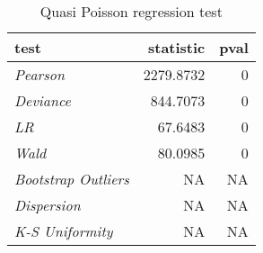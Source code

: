 \begin{table}[H]

\caption{\label{tab:quasipoisson_reg_tests}Quasi Poisson regression test}
\centering
\begin{tabular}[t]{>{}l|r|r}
\hline
test & statistic & pval\\
\hline
\hline
\em{Pearson} & 2279.8732 & 0\\
\hline
\em{Deviance} & 844.7073 & 0\\
\hline
\em{LR} & 67.6483 & 0\\
\hline
\em{Wald} & 80.0985 & 0\\
\hline
\em{Bootstrap Outliers} & NA & NA\\
\hline
\em{Dispersion} & NA & NA\\
\hline
\em{K-S Uniformity} & NA & NA\\
\hline
\end{tabular}
\end{table}